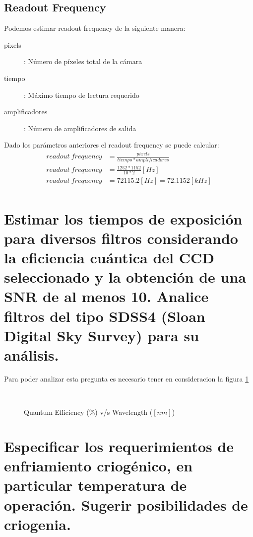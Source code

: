 \documentclass[a4paper,10pt]{article}
\begin{document}
\subsection{Readout Frequency}
Podemos estimar readout frequency de la siguiente manera:
\begin{description}
\item [pixels]: Número de píxeles total de la cámara
\item [tiempo]: Máximo tiempo de lectura requerido
\item [amplificadores]: Número de amplificadores de salida
\end{description}

Dado los parámetros anteriores el readout frequency se puede calcular: 
\begin{align*}
readout\ frequency &= \frac{pixels}{tiempo*amplificadores}\\
readout\ frequency &= \frac{1252*1152}{10*2} [Hz]\\
readout\ frequency &= 72115.2 [Hz] = 72.1152 [kHz]\\
\end{align*}




\section{Estimar los tiempos de exposición para diversos filtros considerando la
eficiencia cuántica del CCD seleccionado y la obtención de una SNR de al menos
10. Analice filtros del tipo SDSS4 (Sloan Digital Sky Survey) para su análisis.}
Para poder analizar esta pregunta es necesario tener en consideracion la figura \ref{fig:p4}

\begin{figure}[ht!]
  \centering
  ~ 
  \caption{Quantum Efficiency (\%) v/s Wavelength ($[nm]$)}
  \label{fig:p4}
\end{figure}

\section{Especificar los requerimientos de enfriamiento criogénico, en particular
temperatura de operación. Sugerir posibilidades de criogenia.}
\end{document}
